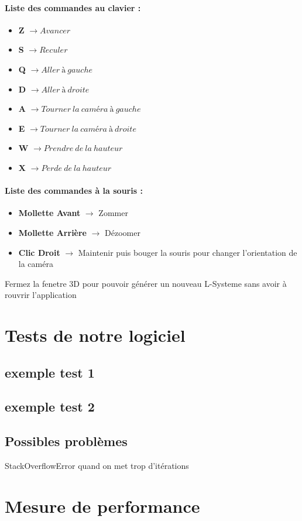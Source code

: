 \paragraph{Liste des commandes au clavier : }
\begin{itemize}
    \item \textbf{Z} $\xrightarrow{} Avancer$
    \item \textbf{S} $\xrightarrow{} Reculer$
    \item \textbf{Q} $\xrightarrow{} Aller \ à \ gauche$
    \item \textbf{D} $\xrightarrow{} Aller \ à \ droite$
    \item \textbf{A} $\xrightarrow{} Tourner \ la \ caméra \ à \ gauche$
    \item \textbf{E} $\xrightarrow{} Tourner \ la \ caméra \ à \ droite$
    \item \textbf{W} $\xrightarrow{} Prendre \ de \ la \ hauteur$
    \item \textbf{X} $\xrightarrow{} Perde \ de \ la \ hauteur$
    \end{itemize}
\paragraph{Liste des commandes à la souris :}
    \begin{itemize}
    \item \textbf{Mollette Avant} $\xrightarrow{}$ Zommer
    \item \textbf{Mollette Arrière} $\xrightarrow{}$ Dézoomer
    \item \textbf{Clic Droit} $\xrightarrow{}$ Maintenir puis bouger la souris pour changer l'orientation de la caméra
    
\end{itemize}


Fermez la fenetre 3D pour pouvoir générer un nouveau L-Systeme sans avoir à rouvrir l'application

\section{Tests de notre logiciel}

\subsection{exemple test 1}

\subsection{exemple test 2}

\subsection{Possibles problèmes}

StackOverflowError quand on met trop d'itérations

\section{Mesure de performance}